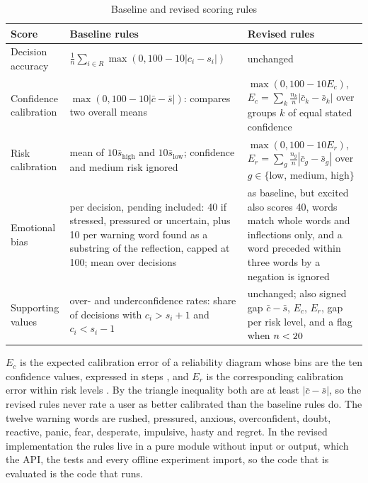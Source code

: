 \documentclass[12pt,a4paper]{article}
\newcommand{\botrule}{\bottomrule}
\newcommand{\tabnote}[1]{\par\vspace{2pt}{\footnotesize\raggedright #1\par}}
\begin{document}
\begin{table}[t]
\caption{Baseline and revised scoring rules}\label{tab:rules}
\footnotesize
\begin{tabular}{@{}L{2.0cm}L{4.6cm}L{4.6cm}@{}}
\toprule
Score & Baseline rules & Revised rules\\
\midrule
Decision accuracy & $\frac{1}{n}\sum_{i\in R}\max(0,100-10|c_i-s_i|)$ & unchanged\\
Confidence calibration & $\max(0,100-10|\bar c-\bar s|)$: compares two overall means & $\max(0,100-10E_c)$, $E_c=\sum_k \frac{n_k}{n}|\bar c_k-\bar s_k|$ over groups $k$ of equal stated confidence\\
Risk calibration & mean of $10\bar s_{\text{high}}$ and $10\bar s_{\text{low}}$; confidence and medium risk ignored & $\max(0,100-10E_r)$, $E_r=\sum_g \frac{n_g}{n}|\bar c_g-\bar s_g|$ over $g\in\{$low, medium, high$\}$\\
Emotional bias & per decision, pending included: 40 if stressed, pressured or uncertain, plus 10 per warning word found as a substring of the reflection, capped at 100; mean over decisions & as baseline, but excited also scores 40, words match whole words and inflections only, and a word preceded within three words by a negation is ignored\\
\midrule
Supporting values & over- and underconfidence rates: share of decisions with $c_i>s_i+1$ and $c_i<s_i-1$ & unchanged; also signed gap $\bar c-\bar s$, $E_c$, $E_r$, gap per risk level, and a flag when $n<20$\\
\botrule
\end{tabular}
\tabnote{$c_i$, stated confidence of decision $i$; $s_i$, its success rating; $n$, number of resolved decisions; $E_c$ and $E_r$, calibration errors in steps of the 1--10 scale.}
\end{table}

$E_c$ is the expected calibration error of a reliability diagram whose bins are the ten confidence values, expressed in steps \cite{naeini2015}, and $E_r$ is the corresponding calibration error within risk levels \cite{kleinberg2017}. By the triangle inequality both are at least $|\bar c-\bar s|$, so the revised rules never rate a user as better calibrated than the baseline rules do. The twelve warning words are rushed, pressured, anxious, overconfident, doubt, reactive, panic, fear, desperate, impulsive, hasty and regret. In the revised implementation the rules live in a pure module without input or output, which the API, the tests and every offline experiment import, so the code that is evaluated is the code that runs.
\end{document}
